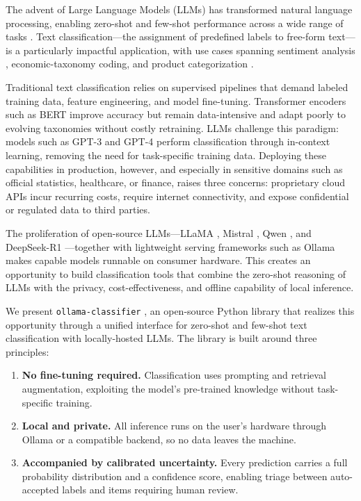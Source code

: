 \documentclass[11pt,a4paper]{article}
\begin{document}
The advent of Large Language Models (LLMs) has transformed natural language
processing, enabling zero-shot and few-shot performance across a wide range
of tasks \citep{brown2020language, radford2019gpt2, zhao2023survey}. Text
classification---the assignment of predefined labels to free-form text---is a
particularly impactful application, with use cases spanning sentiment analysis
\citep{wang2024sentiment}, economic-taxonomy coding, and product
categorization \citep{nunes2025rac}.

Traditional text classification relies on supervised pipelines that demand
labeled training data, feature engineering, and model fine-tuning.
Transformer encoders such as BERT \citep{berki2025nlp} improve accuracy but
remain data-intensive and adapt poorly to evolving taxonomies without costly
retraining. LLMs challenge this paradigm: models such as GPT-3
\citep{brown2020language} and GPT-4 \citep{openai2023gpt4} perform
classification through in-context learning, removing the need for
task-specific training data. Deploying these capabilities in production,
however, and especially in sensitive domains such as official statistics,
healthcare, or finance, raises three concerns: proprietary cloud APIs incur
recurring costs, require internet connectivity, and expose confidential or
regulated data to third parties.

The proliferation of open-source LLMs---LLaMA \citep{touvron2023llama,
meta2024llama3}, Mistral \citep{jiang2023mistral}, Qwen
\citep{yang2024qwen2}, and DeepSeek-R1 \citep{deepseek2025r1}---together with
lightweight serving frameworks such as Ollama \citep{ollama} makes capable
models runnable on consumer hardware. This creates an opportunity to build
classification tools that combine the zero-shot reasoning of LLMs with the
privacy, cost-effectiveness, and offline capability of local inference.

We present \texttt{ollama-classifier} \citep{ollama-classifier}, an
open-source Python library that realizes this opportunity through a unified
interface for zero-shot and few-shot text classification with locally-hosted
LLMs. The library is built around three principles:

\begin{enumerate}[leftmargin=*]
  \item \textbf{No fine-tuning required.} Classification uses prompting and
        retrieval augmentation, exploiting the model's pre-trained knowledge
        without task-specific training.
  \item \textbf{Local and private.} All inference runs on the user's hardware
        through Ollama or a compatible backend, so no data leaves the machine.
  \item \textbf{Accompanied by calibrated uncertainty.} Every prediction
        carries a full probability distribution and a confidence score,
        enabling triage between auto-accepted labels and items requiring
        human review.
\end{enumerate}
\end{document}

